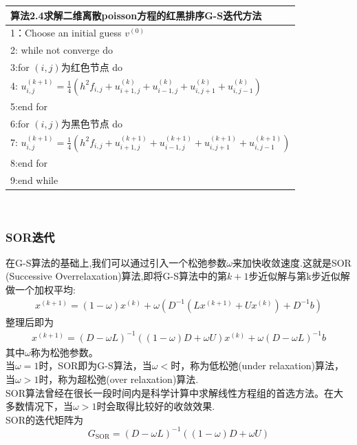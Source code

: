 \documentclass[12pt,a4paper]{article}
\begin{document}
\begin{tabular}{l}
\hline
{\color{blue}算法2.4}求解二维离散poisson方程的红黑排序G-S迭代方法\\
\hline
1：Choose an initial guess $v^{(0)}$\\
2: while not converge do\\
3:\qquad for $(i,j)$为红色节点 do\\
4:\qquad \qquad
$u_{i, j}^{(k+1)}=\frac{1}{4}\left(h^{2} f_{i, j}+u_{i+1, j}^{(k)}+u_{i-1, j}^{(k)}+u_{i, j+1}^{(k)}+u_{i, j-1}^{(k)}\right)$\\
5:\qquad end for\\
6:\qquad for $(i,j)$为黑色节点 do\\
7:\qquad \qquad
$u_{i, j}^{(k+1)}=\frac{1}{4}\left(h^{2} f_{i, j}+u_{i+1, j}^{(k+1)}+u_{i-1, j}^{(k+1)}+u_{i, j+1}^{(k+1)}+u_{i, j-1}^{(k+1)}\right)$\\
8:\qquad end for\\
9:end while\\
\hline
\end{tabular}\\
\subsubsection{SOR迭代}
在G-S算法的基础上,我们可以通过引入一个松弛参数$\omega$来加快收敛速度.这就是SOR (Successive Overrelaxation)算法,即将G-S算法中的第$k+1$步近似解与第k步近似解做一个加权平均:
\begin{align}
x^{(k+1)}=(1-\omega) x^{(k)}+\omega\left(D^{-1}\left(L x^{(k+1)}+U x^{(k)}\right)+D^{-1} b\right)\tag{6.10}
\end{align}
整理后即为
\begin{align}
x^{(k+1)}=(D-\omega L)^{-1}((1-\omega) D+\omega U) x^{(k)}+\omega(D-\omega L)^{-1} b\tag{6.11}
\end{align}
其中$\omega$称为{\color{blue}松弛参数}。\\
当$\omega=1$时，SOR即为G-S算法，当$\omega<$时，称为{\color{blue}低松弛(under relaxation)}算法，当$\omega>1$时，称为{\color{blue}超松弛(over relaxation)}算法.\\
SOR算法曾经在很长一段时间内是科学计算中求解线性方程组的首选方法。在大多数情况下，当$\omega>1$时会取得比较好的收敛效果.\\
SOR的迭代矩阵为
$$
G_{\mathrm{SOR}}=(D-\omega L)^{-1}((1-\omega) D+\omega U)
$$
\end{document}
